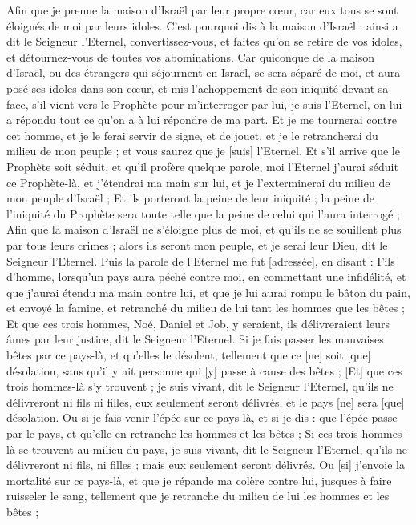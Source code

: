\begin{multicols}{2}
Afin que je prenne la maison d'Israël par leur propre cœur, car eux tous se sont éloignés de moi par leurs idoles.
C'est pourquoi dis à la maison d'Israël : ainsi a dit le Seigneur l'Eternel, convertissez-vous, et faites qu'on se retire de vos idoles, et détournez-vous de toutes vos abominations.
Car quiconque de la maison d'Israël, ou des étrangers qui séjournent en Israël, se sera séparé de moi, et aura posé ses idoles dans son cœur, et mis l'achoppement de son iniquité devant sa face, s'il vient vers le Prophète pour m'interroger par lui, je suis l'Eternel, on lui a répondu tout ce qu'on a à lui répondre de ma part.
Et je me tournerai contre cet homme, et je le ferai servir de signe, et de jouet, et je le retrancherai du milieu de mon peuple ; et vous saurez que je [suis] l'Eternel.
Et s'il arrive que le Prophète soit séduit, et qu'il profère quelque parole, moi l'Eternel j'aurai séduit ce Prophète-là, et j'étendrai ma main sur lui, et je l'exterminerai du milieu de mon peuple d'Israël ;
Et ils porteront la peine de leur iniquité ; la peine de l'iniquité du Prophète sera toute telle que la peine de celui qui l'aura interrogé ;
Afin que la maison d'Israël ne s'éloigne plus de moi, et qu'ils ne se souillent plus par tous leurs crimes ; alors ils seront mon peuple, et je serai leur Dieu, dit le Seigneur l'Eternel.
Puis la parole de l'Eternel me fut [adressée], en disant :
Fils d'homme, lorsqu'un pays aura péché contre moi, en commettant une infidélité, et que j'aurai étendu ma main contre lui, et que je lui aurai rompu le bâton du pain, et envoyé la famine, et retranché du milieu de lui tant les hommes que les bêtes ;
Et que ces trois hommes, Noé, Daniel et Job, y seraient, ils délivreraient leurs âmes par leur justice, dit le Seigneur l'Eternel.
Si je fais passer les mauvaises bêtes par ce pays-là, et qu'elles le désolent, tellement que ce [ne] soit [que] désolation, sans qu'il y ait personne qui [y] passe à cause des bêtes ;
[Et] que ces trois hommes-là s'y trouvent ; je suis vivant, dit le Seigneur l'Eternel, qu'ils ne délivreront ni fils ni filles, eux seulement seront délivrés, et le pays [ne] sera [que] désolation.
Ou si je fais venir l'épée sur ce pays-là, et si je dis : que l'épée passe par le pays, et qu'elle en retranche les hommes et les bêtes ;
Si ces trois hommes-là se trouvent au milieu du pays, je suis vivant, dit le Seigneur l'Eternel, qu'ils ne délivreront ni fils, ni filles ; mais eux seulement seront délivrés.
Ou [si] j'envoie la mortalité sur ce pays-là, et que je répande ma colère contre lui, jusques à faire ruisseler le sang, tellement que je retranche du milieu de lui les hommes et les bêtes ;

\end{multicols}
